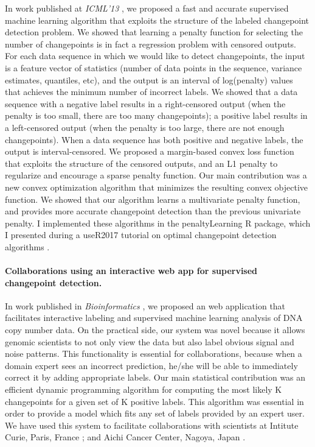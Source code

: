 \documentclass{article}
\begin{document}
In work published at \emph{ICML'13} \citep{HOCKING-penalties}, we proposed a
fast and accurate supervised machine learning algorithm that exploits
the structure of the labeled changepoint detection problem. We showed
that learning a penalty function for selecting the number of
changepoints is in fact a regression problem with censored
outputs. For each data sequence in which we would like to detect
changepoints, the input is a feature vector of statistics (number of
data points in the sequence, variance estimates, quantiles, etc), and
the output is an interval of log(penalty) values that achieves the
minimum number of incorrect labels. We showed that a data sequence
with a negative label results in a right-censored output (when the
penalty is too small, there are too many changepoints); a positive
label results in a left-censored output (when the penalty is too
large, there are not enough changepoints). When a data sequence has
both positive and negative labels, the output is interval-censored.
We proposed a margin-based convex loss function that exploits the
structure of the censored outputs, and an L1 penalty to
regularize and encourage a sparse penalty function. Our main
contribution was a new convex optimization algorithm that minimizes
the resulting convex objective function. We showed that our algorithm learns a
multivariate penalty function, and provides more accurate changepoint
detection than the previous univariate penalty. I implemented these
algorithms in the penaltyLearning R package, which I presented during
a useR2017 tutorial on optimal changepoint detection algorithms
\citep{change-tutorial}.

\paragraph{Collaborations using an interactive web app for supervised
  changepoint detection.} In work published in \emph{Bioinformatics}
\citep{hocking-SegAnnDB}, we proposed an web application that
facilitates interactive labeling and supervised machine learning
analysis of DNA copy number data. On the practical side, our system
was novel because it allows genomic scientists to not only view the
data but also label obvious signal and noise patterns. This
functionality is essential for collaborations, because when a domain
expert sees an incorrect prediction, he/she will be able to
immediately correct it by adding appropriate labels. Our main
statistical contribution was an efficient dynamic programming
algorithm for computing the most likely K changepoints for a given set
of K positive labels. This algorithm was essential in order to provide a model
which fits any set of labels provided by an expert user. We have used
this system to facilitate collaborations with scientists at Intitute
Curie, Paris, France \citep{Chicard}; and Aichi Cancer Center, Nagoya,
Japan \citep{Hocking-Leukemia-2016,m14:clonal}.
\end{document}
